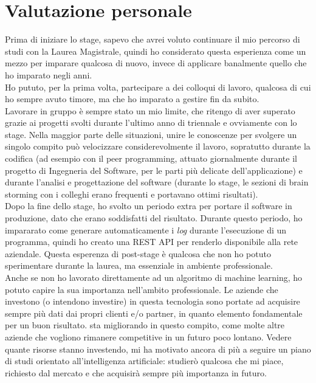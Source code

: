 \section{Valutazione personale}
Prima di iniziare lo stage, sapevo che avrei voluto continuare il mio percorso di studi con la Laurea Magistrale, quindi ho considerato questa esperienza come un mezzo per imparare qualcosa di nuovo, invece di applicare banalmente quello che ho imparato negli anni.\\
Ho pututo, per la prima volta, partecipare a dei colloqui di lavoro, qualcosa di cui ho sempre avuto timore, ma che ho imparato a gestire fin da subito.\\
Lavorare in gruppo è sempre stato un mio limite, che ritengo di aver superato grazie ai progetti svolti durante l'ultimo anno di triennale e ovviamente con lo stage. Nella maggior parte delle situazioni, unire le conoscenze per svolgere un singolo compito può velocizzare considerevolmente il lavoro, sopratutto durante la codifica (ad esempio con il peer programming, attuato giornalmente durante il progetto di Ingegneria del Software, per le parti più delicate dell'applicazione) e durante l'analisi e progettazione del software (durante lo stage, le sezioni di brain storming con i colleghi erano frequenti e portavano ottimi risultati).\\
Dopo la fine dello stage, ho svolto un periodo extra per portare il software in produzione, dato che erano soddisfatti del risultato. Durante questo periodo, ho impararato come generare automaticamente i \textit{log} durante l'esecuzione di un programma, quindi ho creato una REST API per renderlo disponibile alla rete aziendale. Questa esperenza di post-stage è qualcosa che non ho potuto sperimentare durante la laurea, ma essenziale in ambiente professionale.\\
Anche se non ho lavorato direttamente ad un algoritmo di machine learning, ho potuto capire la sua importanza nell'ambito professionale. Le aziende che investono (o intendono investire) in questa tecnologia sono portate ad acquisire sempre più dati dai propri clienti e/o partner, in quanto elemento fondamentale per un buon risultato. \company{} sta migliorando in questo compito, come molte altre aziende che vogliono rimanere competitive in un futuro poco lontano. Vedere quante risorse stanno investendo, mi ha motivato ancora di più a seguire un piano di studi orientato all'intelligenza artificiale: studierò qualcosa che mi piace, richiesto dal mercato e che acquisirà sempre più importanza in futuro.